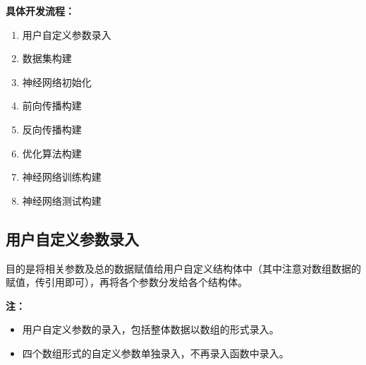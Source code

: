 \documentclass[UTF-8]{progbookcn}
\begin{document}
\begin{keypoint}
\noindent\textbf{具体开发流程：}
\begin{enumerate}
  \item 用户自定义参数录入
  \item 数据集构建
  \item 神经网络初始化
  \item 前向传播构建
  \item 反向传播构建
  \item 优化算法构建
  \item 神经网络训练构建
  \item 神经网络测试构建
\end{enumerate}
\end{keypoint}

\subsection{用户自定义参数录入}
\begin{keypoint}
目的是将相关参数及总的数据赋值给用户自定义结构体中（其中注意对数组数据的赋值，传引用即可），再将各个参数分发给各个结构体。
\end{keypoint}

\begin{table}[!h]
\centering
\caption{用户自定义参数录入相关函数}
\end{table}
\noindent\textbf{注：}
\begin{itemize}
  \item 用户自定义参数的录入，包括整体数据以数组的形式录入。
  \item 四个数组形式的自定义参数单独录入，不再录入函数中录入。
\end{itemize}
\end{document}
